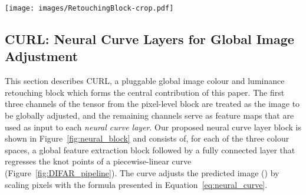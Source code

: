 \documentclass[a4paper,conference]{IEEEtran}
\begin{document}
\begin{figure*}[t!]
\begin{center}
\texttt{[image: images/RetouchingBlock-crop.pdf]}
\end{center}
\caption{\textbf{CURL block} refines the image from the backbone network to adjust luminance, colour and saturation. The image has luminance adjusted first, color (RGB) second, and saturation third using three piecewise linear curves. The output of this block is the final RGB image.  is number of feature maps,  stride,  dilation rate,  image height,  image width.}
\label{fig:neural_block}
\end{figure*}


\subsection{CURL: Neural Curve Layers for Global Image Adjustment}\label{sec:highlevel}

This section describes CURL, a pluggable global image colour and luminance retouching block which forms the central contribution of this paper. The first three channels of the  tensor from the pixel-level block are treated as the image to be globally adjusted, and the remaining channels serve as feature maps that are used as input to each \emph{neural curve layer}. Our proposed neural curve layer block is shown in Figure~\ref{fig:neural_block} and consists of, for each of the three colour spaces, a global feature extraction block followed by a fully connected layer that regresses the knot points of a piecewise-linear curve (Figure~\ref{fig:DIFAR_pipeline}). The curve adjusts the predicted image () by scaling pixels with the formula presented in Equation~\ref{eq:neural_curve}.



{}
\end{document}
